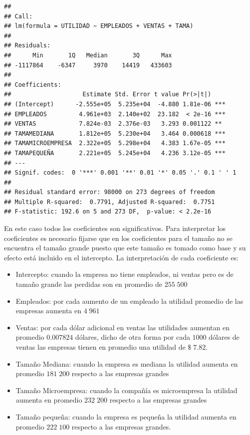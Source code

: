 \documentclass[
]{krantz}
\providecommand{\tightlist}{%
  \setlength{\itemsep}{0pt}\setlength{\parskip}{0pt}}
\begin{document}
\begin{verbatim}
## 
## Call:
## lm(formula = UTILIDAD ~ EMPLEADOS + VENTAS + TAMA)
## 
## Residuals:
##      Min       1Q   Median       3Q      Max 
## -1117864    -6347     3970    14419   433603 
## 
## Coefficients:
##                    Estimate Std. Error t value Pr(>|t|)    
## (Intercept)      -2.555e+05  5.235e+04  -4.880 1.81e-06 ***
## EMPLEADOS         4.961e+03  2.140e+02  23.182  < 2e-16 ***
## VENTAS            7.824e-03  2.376e-03   3.293 0.001122 ** 
## TAMAMEDIANA       1.812e+05  5.230e+04   3.464 0.000618 ***
## TAMAMICROEMPRESA  2.322e+05  5.298e+04   4.383 1.67e-05 ***
## TAMAPEQUEÑA       2.221e+05  5.245e+04   4.236 3.12e-05 ***
## ---
## Signif. codes:  0 '***' 0.001 '**' 0.01 '*' 0.05 '.' 0.1 ' ' 1
## 
## Residual standard error: 98000 on 273 degrees of freedom
## Multiple R-squared:  0.7791, Adjusted R-squared:  0.7751 
## F-statistic: 192.6 on 5 and 273 DF,  p-value: < 2.2e-16
\end{verbatim}

En este caso todos los coeficientes son significativos. Para interpretar los coeficientes es necesario fijarse que en los coeficientes para el tamaño no se encuentra el tamaño grande puesto que este tamaño es tomado como base y su efecto está incluido en el intercepto. La interpretación de cada coeficiente es:

\begin{itemize}
\tightlist
\item
  Intercepto: cuando la empresa no tiene empleados, ni ventas pero es de tamaño grande las perdidas son en promedio de \(255\;500\)
\item
  Empleados: por cada aumento de un empleado la utilidad promedio de las empresas aumenta en \(4\;961\)
\item
  Ventas: por cada dólar adicional en ventas las utilidades aumentan en promedio \(0.007824\) dólares, dicho de otra forma por cada \(1000\) dólares de ventas las empresas tienen en promedio una utilidad de \(\$\;7.82\).
\item
  Tamaño Mediana: cuando la empresa es mediana la utilidad aumenta en promedio \(181\;200\) respecto a las empresas grandes
\item
  Tamaño Microempresa: cuando la compañía es microempresa la utilidad aumenta en promedio \(232\;200\) respecto a las empresas grandes
\item
  Tamaño pequeña: cuando la empresa es pequeña la utilidad aumenta en promedio \(222\;100\) respecto a las empresas grandes.
\end{itemize}
\end{document}
